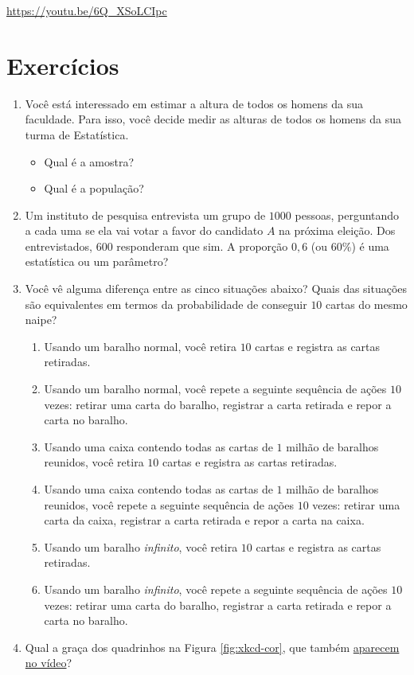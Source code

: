 \documentclass[
  11pt]{report}
\providecommand{\tightlist}{%
  \setlength{\itemsep}{0pt}\setlength{\parskip}{0pt}}
\begin{document}
\begin{center} \url{https://youtu.be/6Q_XSoLCIpc} \end{center}

\hypertarget{exercuxedcios}{%
\section{Exercícios}\label{exercuxedcios}}

\begin{enumerate}
\def\labelenumi{\arabic{enumi}.}
\item
  Você está interessado em estimar a altura de todos os homens da sua faculdade. Para isso, você decide medir as alturas de todos os homens da sua turma de Estatística.

  \begin{itemize}
  \tightlist
  \item
    Qual é a amostra?
  \item
    Qual é a população?
  \end{itemize}
\item
  Um instituto de pesquisa entrevista um grupo de $1000$ pessoas, perguntando a cada uma se ela vai votar a favor do candidato $A$ na próxima eleição. Dos entrevistados, $600$ responderam que sim. A proporção $0{,}6$ (ou $60\%$) é uma estatística ou um parâmetro?
\item
  Você vê alguma diferença entre as cinco situações abaixo? Quais das situações são equivalentes em termos da probabilidade de conseguir $10$ cartas do mesmo naipe?

  \begin{enumerate}
  \def\labelenumii{\alph{enumii}.}
  \item
    Usando um baralho normal, você retira $10$ cartas e registra as cartas retiradas.
  \item
    Usando um baralho normal, você repete a seguinte sequência de ações $10$ vezes: retirar uma carta do baralho, registrar a carta retirada e repor a carta no baralho.
  \item
    Usando uma caixa contendo todas as cartas de $1$ milhão de baralhos reunidos, você retira $10$ cartas e registra as cartas retiradas.
  \item
    Usando uma caixa contendo todas as cartas de $1$ milhão de baralhos reunidos, você repete a seguinte sequência de ações $10$ vezes: retirar uma carta da caixa, registrar a carta retirada e repor a carta na caixa.
  \item
    Usando um baralho \emph{infinito}, você retira $10$ cartas e registra as cartas retiradas.
  \item
    Usando um baralho \emph{infinito}, você repete a seguinte sequência de ações $10$ vezes: retirar uma carta do baralho, registrar a carta retirada e repor a carta no baralho.
  \end{enumerate}
\item
  Qual a graça dos quadrinhos na Figura \ref{fig:xkcd-cor}, que também \href{https://youtu.be/6Q_XSoLCIpc?t=1385}{aparecem no vídeo}?


\end{enumerate}
\end{document}
